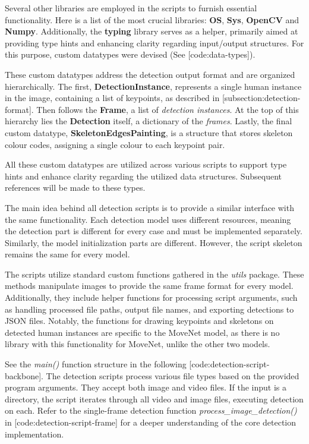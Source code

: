 Several other libraries are employed in the scripts to furnish essential functionality. Here is a list of the most crucial libraries: {\bf OS}, {\bf Sys}, {\bf OpenCV} and {\bf Numpy}. Additionally, the {\bf typing} library serves as a helper, primarily aimed at providing type hints and enhancing clarity regarding input/output structures. For this purpose, custom datatypes were devised (See [code:data-types]).


These custom datatypes address the detection output format and are organized hierarchically. The first, {\bf DetectionInstance}, represents a single human instance in the image, containing a list of keypoints, as described in [subsection:detection-format]. Then follows the {\bf Frame}, a list of {\em detection instances}. At the top of this hierarchy lies the {\bf Detection} itself, a dictionary of the {\em frames}. Lastly, the final custom datatype, {\bf SkeletonEdgesPainting}, is a structure that stores skeleton colour codes, assigning a single colour to each keypoint pair.

All these custom datatypes are utilized across various scripts to support type hints and enhance clarity regarding the utilized data structures. Subsequent references will be made to these types.

The main idea behind all detection scripts is to provide a similar interface with the same functionality. Each detection model uses different resources, meaning the detection part is different for every case and must be implemented separately. Similarly, the model initialization parts are different. However, the script skeleton remains the same for every model.

The scripts utilize standard custom functions gathered in the {\it utils} package. These methods manipulate images to provide the same frame format for every model. Additionally, they include helper functions for processing script arguments, such as handling processed file paths, output file names, and exporting detections to JSON files. Notably, the functions for drawing keypoints and skeletons on detected human instances are specific to the MoveNet model, as there is no library with this functionality for MoveNet, unlike the other two models.

See the {\it main()} function structure in the following [code:detection-script-backbone]. The detection scripts process various file types based on the provided program arguments. They accept both image and video files. If the input is a directory, the script iterates through all video and image files, executing detection on each. Refer to the single-frame detection function {\it process_image_detection()} in [code:detection-script-frame] for a deeper understanding of the core detection implementation.

